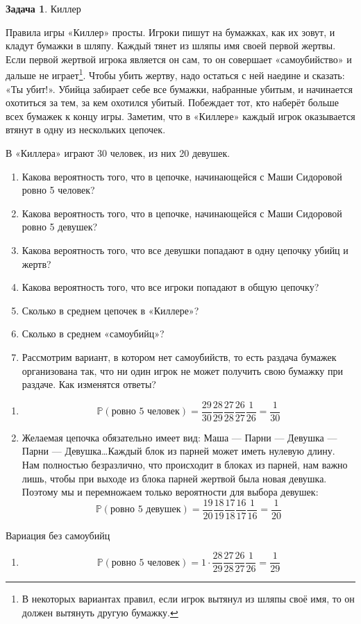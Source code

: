 \documentclass[nobib]{tufte-handout}
\theoremstyle{definition}
\newtheorem{problem}{Задача}
\renewcommand{\P}{\mathbb{P}}
\begin{document}
\begin{problem}
Киллер

Правила игры «Киллер» просты. Игроки пишут на бумажках, как их зовут, и кладут бумажки в шляпу. Каждый тянет из шляпы имя своей первой жертвы. Если первой жертвой игрока является он сам, то он совершает «самоубийство» и дальше не играет\footnote{В некоторых вариантах правил, если игрок вытянул из шляпы своё имя, то он должен вытянуть другую бумажку.}. Чтобы убить жертву, надо остаться с ней наедине и сказать: «Ты убит!». Убийца забирает себе все бумажки, набранные убитым, и начинается охотиться за тем, за кем охотился убитый.  Побеждает тот, кто наберёт больше всех бумажек к концу игры. Заметим, что в «Киллере» каждый игрок оказывается втянут в одну из нескольких цепочек.

В «Киллера» играют 30 человек, из них 20 девушек.

\begin{enumerate}
\item Какова вероятность того, что в цепочке, начинающейся с Маши Сидоровой ровно 5 человек?
\item Какова вероятность того, что в цепочке, начинающейся с Маши Сидоровой ровно 5 девушек?
\item Какова вероятность того, что все девушки попадают в одну цепочку убийц и жертв?
\item Какова вероятность того, что все игроки попадают в общую цепочку?
\item Сколько в среднем цепочек в «Киллере»?
\item Сколько в среднем «самоубийц»?
\item Рассмотрим вариант, в котором нет самоубийств, то есть раздача бумажек организована так, что ни один игрок не может получить свою бумажку при раздаче. Как изменятся ответы?
\end{enumerate}

\begin{sol}

\begin{enumerate}
\item
\[
\P(\text{ровно 5 человек}) = \frac{29}{30} \frac{28}{29} \frac{27}{28} \frac{26}{27} \frac{1}{26} = \frac{1}{30}
\]
\item Желаемая цепочка обязательно имеет вид: Маша — Парни — Девушка — Парни — Девушка\ldots Каждый блок из парней может иметь нулевую длину. Нам полностью безразлично, что происходит в блоках из парней, нам важно лишь, чтобы при выходе из блока парней жертвой была новая девушка. Поэтому мы и перемножаем только вероятности для выбора девушек:
\[
\P(\text{ровно 5 девушек}) = \frac{19}{20} \frac{18}{19} \frac{17}{18} \frac{16}{17} \frac{1}{16} = \frac{1}{20}
\]
\end{enumerate}

Вариация без самоубийц
\begin{enumerate}
\item
\[
\P(\text{ровно 5 человек}) = 1 \cdot \frac{28}{29} \frac{27}{28} \frac{26}{27} \frac{1}{26} = \frac{1}{29}
\]
\end{enumerate}


\end{sol}

\end{problem}
\end{document}
